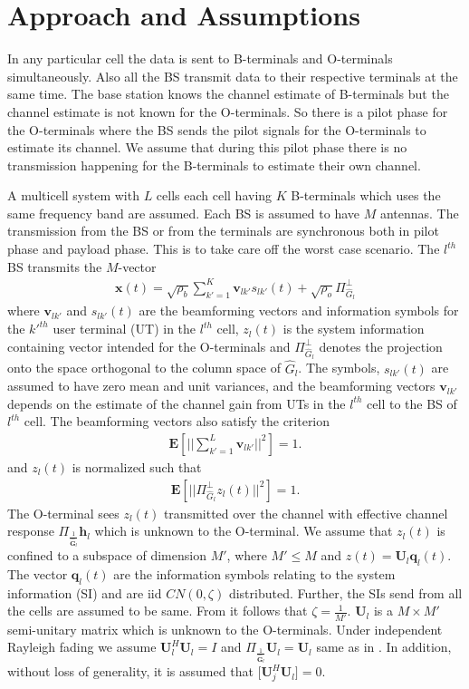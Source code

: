 \documentclass[10pt, a4paper, twoside,fleqn]{article}
\begin{document}
\section{Approach and Assumptions}	
	In any particular cell the data is sent to B-terminals and O-terminals simultaneously. Also all the BS transmit data to their respective terminals at the same time. The base station knows the channel estimate of B-terminals but the channel estimate is not known for the O-terminals. So there is a pilot phase for the O-terminals where the BS sends the pilot signals for the O-terminals to estimate its channel. We assume that during this pilot phase there is no transmission happening for the B-terminals to estimate their own channel.

	A multicell system with $L$ cells each cell having $K$ B-terminals which uses the same frequency band are assumed. Each BS is assumed to have $M$ antennas. The transmission from the BS or from the terminals are synchronous both in pilot phase and payload phase. This is to take care off the worst case scenario. The $l^{th}$ BS transmits the $M$-vector
\begin{eqnarray}
	\pmb{x}(t) = \sqrt{\rho_b}\sum\limits_{k'=1}^{K}\boldsymbol{v}_{lk'}s_{lk'}(t)
    		      + \sqrt{\rho_o}\Pi^{\perp}_{{\widehat{G}_l}}
\end{eqnarray}
where $\pmb{v}_{lk'}$ and $s_{lk'}(t)$ are the beamforming vectors and information symbols for the $k'^{th}$ user terminal (UT) in the $l^{th}$ cell, $z_l(t)$ is the system information containing vector intended for the O-terminals and $\Pi^{\perp}_{{\widehat{G}_l}}$ denotes the projection onto the space orthogonal to the column space of $\hat G_l$. The symbols, $s_{lk'}(t)$ are assumed to have zero mean and unit variances, and the beamforming vectors $\pmb{v}_{lk'}$ depends on the estimate of the channel gain from UTs in the $l^{th}$ cell to the BS of $l^{th}$ cell. 
The beamforming vectors also satisfy the criterion
\begin{eqnarray}
	\pmb{E}\left[||\sum\limits_{k'=1}^{L}\pmb{v}_{lk'}||^2\right]=1.
\end{eqnarray}
and $z_l(t)$ is normalized such that
\begin{eqnarray}\label{eqn:zlcondition}
	\pmb{E}\left[||\Pi^{\perp}_{{\widehat{G}_l}}z_l(t)||^2\right]=1.
\end{eqnarray}
The O-terminal sees $z_l(t)$ transmitted over the channel with effective channel response $\Pi_{\frac{1}{\pmb{\hat G}_l}}\pmb{h}_l$ which is unknown to the O-terminal. We assume that $z_l(t)$ is confined to a subspace of dimension $M'$, where $M'\leq M$ and $z(t) = \pmb{U}_l\pmb{q}_l(t)$. The vector $\pmb{q}_l(t)$ are the information symbols relating to the system information (SI) and are iid $CN(0,\zeta)$ distributed. Further, the SIs send from all the cells are assumed to be same. From \cite{bib:jbb} it follows that $\zeta=\frac{1}{M'}$. $\pmb{U}_l$ is a $M\times M'$ semi-unitary matrix which is unknown to the O-terminals. Under independent Rayleigh fading we assume $\pmb{U}_l^H\pmb{U}_l=I$ and $\Pi_{\frac{1}{\pmb{\hat G}_l}}\pmb{U}_l=\pmb{U}_l$ same as in \cite{bib:jbb}. In addition, without loss of generality, it is assumed that [$\pmb{U}_j^H\pmb{U}_l]=0$.
\end{document}
